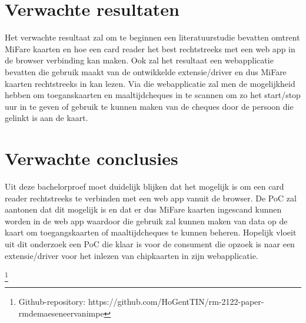 \documentclass{hogent-article}
\begin{document}
\section{Verwachte resultaten}
Het verwachte resultaat zal om te beginnen een literatuurstudie bevatten omtrent MiFare kaarten en hoe een card reader het best rechtstreeks met een web app in de browser verbinding kan maken.
Ook zal het resultaat een webapplicatie bevatten die gebruik maakt van de ontwikkelde extensie/driver en dus MiFare kaarten rechtstreeks in kan lezen. Via die webapplicatie zal men de mogelijkheid hebben om toeganskaarten en maaltijdcheques in te scannen om zo het start/stop uur in te geven of gebruik te kunnen maken van de cheques door de persoon die gelinkt is aan de kaart.

\section{Verwachte conclusies}
Uit deze bachelorproef moet duidelijk blijken dat het mogelijk is om een card reader rechtstreeks te verbinden met een web app vanuit de browser. De PoC zal aantonen dat dit mogelijk is en dat er dus MiFare kaarten ingescand kunnen worden in de web app waardoor die gebruik zal kunnen maken van data op de kaart om toegangskaarten of maaltijdcheques te kunnen beheren. Hopelijk vloeit uit dit onderzoek een PoC die klaar is voor de consument die opzoek is naar een extensie/driver voor het inlezen van chipkaarten in zijn webapplicatie.

\printbibliography[heading=bibintoc]
\footnote{Github-repository: https://github.com/HoGentTIN/rm-2122-paper-rmdemaeseneervanimpe}
\end{document}
